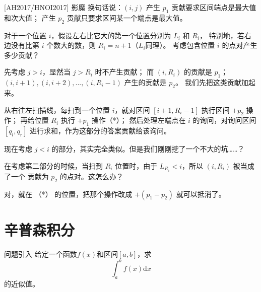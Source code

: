 \documentclass{beamer}
\begin{document}
\begin{frame}{[AH2017/HNOI2017] 影魔}
    \footnotesize
    换句话说：$(i,j)$ 产生 $p_1$ 贡献要求区间端点是最大值和次大值；
    产生 $p_2$ 贡献只要求区间某一个端点是最大值。

    \vspace{1em}
    对于一个位置 $i$，假设左右比它大的第一个位置分别为 $L_i$ 和 $R_i$，
    特别地，若右边没有比第 $i$ 个数大的数，则 $R_i=n+1$（$L_i$同理）。
    考虑包含位置 $i$ 的点对产生多少贡献？

    \vspace{1em}\pause
    先考虑 $j>i$，显然当 $j>R_i$ 时不产生贡献；
    而 $(i,R_i)$ 的贡献是 $p_1$；
     $(i,i+1),(i,i+2),...,(i,R_i-1)$ 产生的贡献是 $p_2$。
    我们先把这类贡献加起来。

    \vspace{1em}\pause
    从右往左扫描线，每扫到一个位置 $i$，就对区间 $[i+1,R_i-1]$ 执行区间 $+p_2$ 操作；
    再给位置 $R_i$ 执行 $+p_1$ 操作（*）；
    然后处理左端点在 $i$ 的询问，对询问区间 $[q_l,q_r]$ 进行求和，作为这部分的答案贡献给该询问。

    \vspace{1em}\pause
    现在考虑 $j<i$ 的部分，其实完全类似。但是我们刚刚挖了一个不大的坑……？

    \vspace{1em}\pause
    在考虑第二部分的时候，当扫到 $R_i$ 位置时，由于 $L_{R_i}<i$，所以 $(i,R_i)$ 被当成了一个
    贡献为 $p_2$ 的点对。这怎么办？

    \vspace{1em}\pause
    对，就在 （*） 的位置，把那个操作改成 $+(p_1-p_2)$ 就可以抵消了。
\end{frame}

\section{辛普森积分}

\begin{frame}{问题引入}
    给定一个函数$f(x)$和区间$[a,b]$，求
    \begin{equation*}
        \int_a^b f(x)\text{d}x
    \end{equation*}
    的近似值。
\end{frame}
\end{document}
